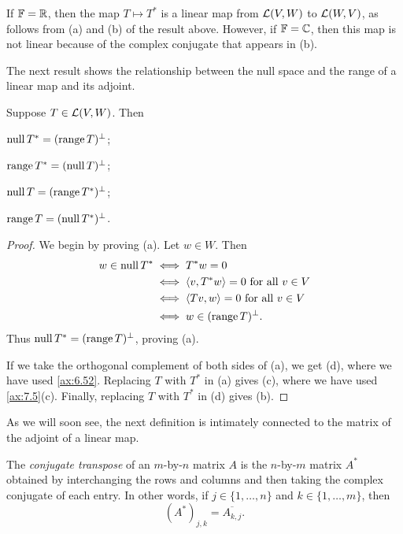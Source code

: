 If $\mathbb{F}=\mathbb{R}$, then the map $T\mapsto T^*$ is a linear map from $\mathcal{L}(V,W)$ to
$\mathcal{L}(W,V)$, as follows from (a) and (b) of the result above. However, if
$\mathbb{F}=\mathbb{C}$, then this map is not linear because of the complex conjugate that
appears in (b).

The next result shows the relationship between the null space and the range of
a linear map and its adjoint.

\begin{result}\label{ax:7.6}
Suppose $T\in\mathcal{L}(V,W)$. Then
\begin{parts}
\item $\operatorname{null} T^*=(\operatorname{range} T)^\perp$;
\item $\operatorname{range} T^*=(\operatorname{null} T)^\perp$;
\item $\operatorname{null} T=(\operatorname{range} T^*)^\perp$;
\item $\operatorname{range} T=(\operatorname{null} T^*)^\perp$.
\end{parts}
\end{result}

\begin{proof}
We begin by proving (a). Let $w\in W$. Then
\begin{align*}
w\in\operatorname{null} T^* &\iff T^*w=0\\
  &\iff \langle v, T^*w \rangle=0 \text{ for all } v\in V\\
  &\iff \langle Tv, w \rangle=0 \text{ for all } v\in V\\
  &\iff w\in(\operatorname{range} T)^\perp.
\end{align*}
Thus $\operatorname{null} T^*=(\operatorname{range} T)^\perp$, proving (a).

If we take the orthogonal complement of both sides of (a), we get (d), where we
have used \ref{ax:6.52}. Replacing $T$ with $T^*$ in (a) gives (c), where we
have used \ref{ax:7.5}(c). Finally, replacing $T$ with $T^*$ in (d) gives (b).
\end{proof}

As we will soon see, the next definition is intimately connected to the matrix
of the adjoint of a linear map.

\begin{definition}\label{ax:7.7}
The \emph{conjugate transpose} of an $m$-by-$n$ matrix $A$ is the $n$-by-$m$
matrix $A^*$ obtained by interchanging the rows and columns and then taking the
complex conjugate of each entry. In other words, if $j\in\{1,\dots,n\}$ and
$k\in\{1,\dots,m\}$, then
\[ (A^*)_{j,k} = \overline{A_{k,j}}. \]
\end{definition}

